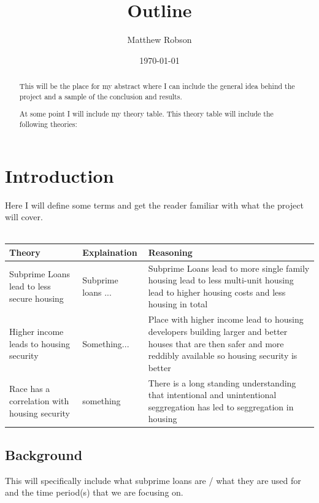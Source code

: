 \documentclass{article}
\title{Outline}
\author{Matthew Robson}
\date{\today}
\begin{document}
\maketitle

\begin{abstract}
    This will be the place for my abstract where I can include the general idea behind the project and
    a sample of the conclusion and results.

\noindent
    At some point I will include my theory table. This theory table will include the following theories:

\end{abstract}

\section{Introduction}
Here I will define some terms and get the reader familiar with what the project will cover.  
\\
\\
\noindent
\begin{tabularx}{\textwidth}{|L|L|L|}
        \hline
        \textbf{Theory} & \textbf{Explaination} & \textbf{Reasoning} \\ \hline
        Subprime Loans lead to less secure housing & 
            Subprime loans ... &
            Subprime Loans lead to more single family housing lead to less multi-unit housing
              lead to higher housing costs and less housing in total \\ \hline

        Higher income leads to housing security &
            Something... &
            Place with higher income lead to housing developers building larger and better houses that 
              are then safer and more reddibly available so housing security is better \\ \hline

        Race has a correlation with housing security &
            something &
            There is a long standing understanding that intentional and unintentional seggregation has led 
              to seggregation in housing \\ \hline

\end{tabularx}

\subsection{Background}
This will specifically include what subprime loans are / what they are used for and the time period(s) that we 
are focusing on.
\end{document}
